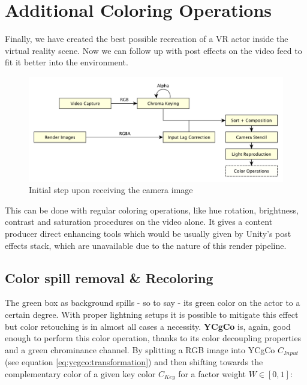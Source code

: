 %
\section{Additional Coloring Operations}

Finally, we have created the best possible recreation of a VR actor inside the 
virtual reality scene. Now we can follow up with post effects on the video feed 
to fit it better into the environment.

\begin{figure}[htb]
	\includegraphics[width=\textwidth]{_raw_resources/pipeline_steps/4_8_color.pdf}
	\caption{Initial step upon receiving the camera image}
	\label{fig:steps:recolor}
\end{figure}

This can be done with regular coloring operations, like hue rotation, 
brightness, contrast and saturation procedures on the video alone. It gives a 
content producer direct enhancing tools which would be usually given by Unity's 
post effects stack, which are unavailable due to the nature of this render 
pipeline.

\subsection{Color spill removal \& Recoloring}

The green box as background spills - so to say - its green color on the actor 
to a certain degree. With proper lightning setups it is possible to mitigate 
this effect but color retouching is in almost all cases a necessity. 
\textbf{YCgCo} is, again, good enough to perform this color operation, thanks 
to its color decoupling properties and a green chrominance channel. By 
splitting a RGB image into YCgCo $C_{Input}$ (see equation 
\eqref{eq:ycgco:transformation}) and then shifting towards the complementary 
color of a given key color $C_{Key}$ for a factor weight $W \in [0, 1]$:

